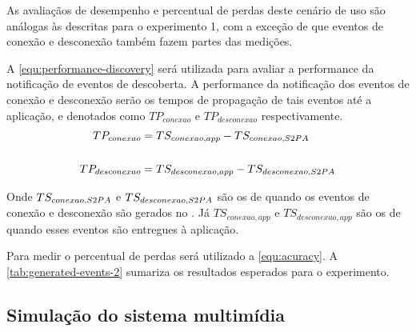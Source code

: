 As avaliaçãos de desempenho e percentual de perdas deste cenário de uso são análogas às descritas para o experimento 1, com a exceção de que eventos de conexão e desconexão também fazem partes das medições.

A \autoref{equ:performance-discovery} será utilizada para avaliar a performance da notificação de eventos de descoberta. A performance da notificação dos eventos de conexão e desconexão serão os tempos de propagação de tais eventos até a aplicação, e denotados como $TP_{conexao}$ e $TP_{desconexao}$ respectivamente.
\begin{align}
	TP_{conexao} &= TS_{conexao,app} - TS_{conexao,S2PA} \label{equ:performance-connection} \\
	\nonumber\\
	TP_{desconexao} &= TS_{desconexao,app} - TS_{desconexao,S2PA} \label{equ:performance-disconnection}
\end{align}

Onde $TS_{conexao,S2PA}$ e $TS_{desconexao,S2PA}$ são os \timestamps de quando os eventos de conexão e desconexão são gerados no \stwopa. Já $TS_{conexao,app}$ e $TS_{desconexao,app}$ são os \timestamps de quando esses eventos são entregues à aplicação.

Para medir o percentual de perdas será utilizado a \autoref{equ:acuracy}. A \autoref{tab:generated-events-2} sumariza os resultados esperados para o experimento.

\begin{table}[htb]
	\begin{center}
	\end{center}
\end{table}

\subsection{Simulação do sistema multimídia}


